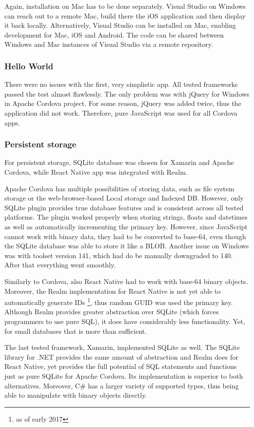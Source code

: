 \documentclass[english,master,public,dept460,male,cpdeclaration,oneside]{diploma}
\begin{document}
Again, installation on Mac has to be done separately. Visual Studio on Windows can reach out to a remote Mac, build there the iOS application and then display it back locally. Alternatively, Visual Studio can be installed on Mac, enabling development for Mac, iOS and Android. The code can be shared between Windows and Mac instances of Visual Studio via a remote repository.

\subsubsection{Hello World}
There were no issues with the first, very simplistic app. All tested frameworks passed the test almost flawlessly. The only problem was with jQuery for Windows in Apache Cordova project. For some reason, jQuery was added twice, thus the application did not work. Therefore, pure JavaScript was used for all Cordova apps.

\subsubsection{Persistent storage}
For persistent storage, SQLite database was chosen for Xamarin and Apache Cordova, while React Native app was integrated with Realm. 

Apache Cordova has multiple possibilities of storing data, such as file system storage or the web-browser-based Local storage and Indexed DB. However, only SQLite plugin provides true database features and is consistent across all tested platforms. The plugin worked properly when storing strings, floats and datetimes as well as automatically incrementing the primary key. However, since JavaScript cannot work with binary data, they had to be converted to base-64, even though the SQLite database was able to store it like a BLOB. Another issue on Windows was with toolset version 141, which had do be manually downgraded to 140. After that everything went smoothly.

Similarly to Cordova, also React Native had to work with base-64 binary objects. Moreover, the Realm implementation for React Native is not yet able to automatically generate IDs \footnote{as of early 2017}, thus random GUID was used the primary key. Although Realm provides greater abstraction over SQLite (which forces programmers to use pure SQL), it does have considerably less functionality. Yet, for small databases that is more than sufficient.

The last tested framework, Xamarin, implemented SQLite as well. The SQLite library for .NET provides the same amount of abstraction and Realm does for React Native, yet provides the full potential of SQL statements and functions just as pure SQLite for Apache Cordova. Its implementation is superior to both alternatives. Moreover, C\# has a larger variety of supported types, thus being able to manipulate with binary objects directly.
\end{document}
